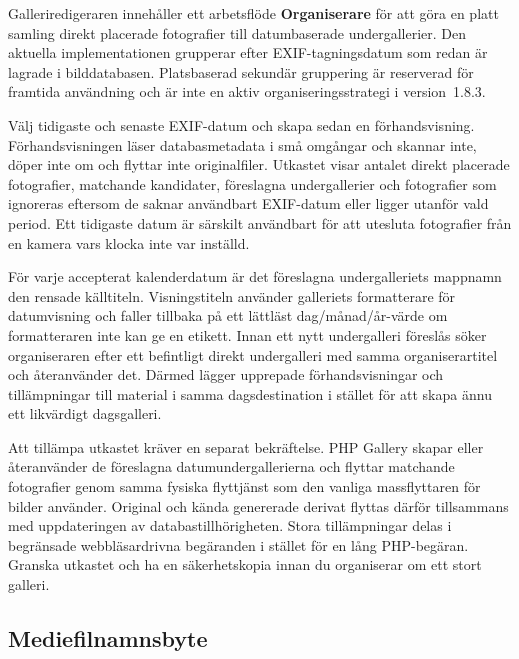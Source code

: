 \documentclass[11pt,a4paper]{article}
\newcommand{\version}{1.8.3}
\newcommand{\ui}[1]{\textbf{#1}}
\begin{document}
Galleriredigeraren innehåller ett arbetsflöde \ui{Organiserare} för att göra en
platt samling direkt placerade fotografier till datumbaserade undergallerier.
Den aktuella implementationen grupperar efter EXIF-tagningsdatum som redan är
lagrade i bilddatabasen. Platsbaserad sekundär gruppering är reserverad för
framtida användning och är inte en aktiv organiseringsstrategi i
version~\version{}.

Välj tidigaste och senaste EXIF-datum och skapa sedan en förhandsvisning.
Förhandsvisningen läser databasmetadata i små omgångar och skannar inte, döper
inte om och flyttar inte originalfiler. Utkastet visar antalet direkt placerade
fotografier, matchande kandidater, föreslagna undergallerier och fotografier som
ignoreras eftersom de saknar användbart EXIF-datum eller ligger utanför vald
period. Ett tidigaste datum är särskilt användbart för att utesluta fotografier
från en kamera vars klocka inte var inställd.

För varje accepterat kalenderdatum är det föreslagna undergalleriets mappnamn
den rensade källtiteln. Visningstiteln använder galleriets formatterare för
datumvisning och faller tillbaka på ett lättläst dag/månad/år-värde om
formatteraren inte kan ge en etikett. Innan ett nytt undergalleri föreslås söker
organiseraren efter ett befintligt direkt undergalleri med samma
organiserartitel och återanvänder det. Därmed lägger upprepade förhandsvisningar
och tillämpningar till material i samma dagsdestination i stället för att skapa
ännu ett likvärdigt dagsgalleri.

Att tillämpa utkastet kräver en separat bekräftelse. PHP Gallery skapar eller
återanvänder de föreslagna datumundergallerierna och flyttar matchande
fotografier genom samma fysiska flyttjänst som den vanliga massflyttaren för
bilder använder. Original och kända genererade derivat flyttas därför
tillsammans med uppdateringen av databastillhörigheten. Stora tillämpningar
delas i begränsade webbläsardrivna begäranden i stället för en lång PHP-begäran.
Granska utkastet och ha en säkerhetskopia innan du organiserar om ett stort
galleri.

\subsection{Mediefilnamnsbyte}
\end{document}
